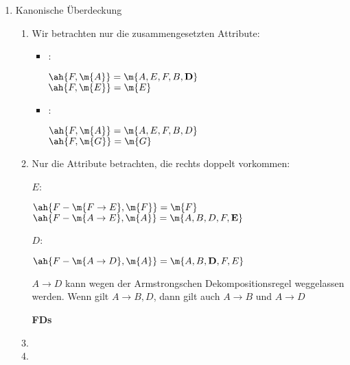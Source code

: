 \documentclass{lehramt-informatik-aufgabe}
\begin{document}
\begin{liAntwort}

\begin{enumerate}

\item Kanonische Überdeckung

\begin{enumerate}

%

\item {}

Wir betrachten nur die zusammengesetzten Attribute:

\begin{itemize}
\item {}:

$\ah{F, \m{A}} = \m{A, E, F, B, \textbf{D}}$ \\
$\ah{F, \m{E}} = \m{E}$

\item {}:

$\ah{F, \m{A}} = \m{A, E, F, B, D}$ \\
$\ah{F, \m{G}} = \m{G}$
\end{itemize}


%

\item {}

Nur die Attribute betrachten, die rechts doppelt vorkommen:

$E$:

$\ah{F - \m{F \rightarrow E}, \m{F}} = \m{F}$ \\
$\ah{F - \m{A \rightarrow E}, \m{A}} = \m{A, B, D, F, \textbf{E}}$

$D$:

$\ah{F - \m{A \rightarrow D}, \m{A}} = \m{A, B, \textbf{D}, F, E}$

$A \rightarrow D$ kann wegen der Armstrongschen Dekompositionsregel
weggelassen werden. Wenn gilt $A \rightarrow B, D$, dann gilt auch $A
\rightarrow B$ und $A \rightarrow D$

\textbf{FDs}


\item {}


\item {}


\end{enumerate}
\end{enumerate}
\end{liAntwort}
\end{document}
